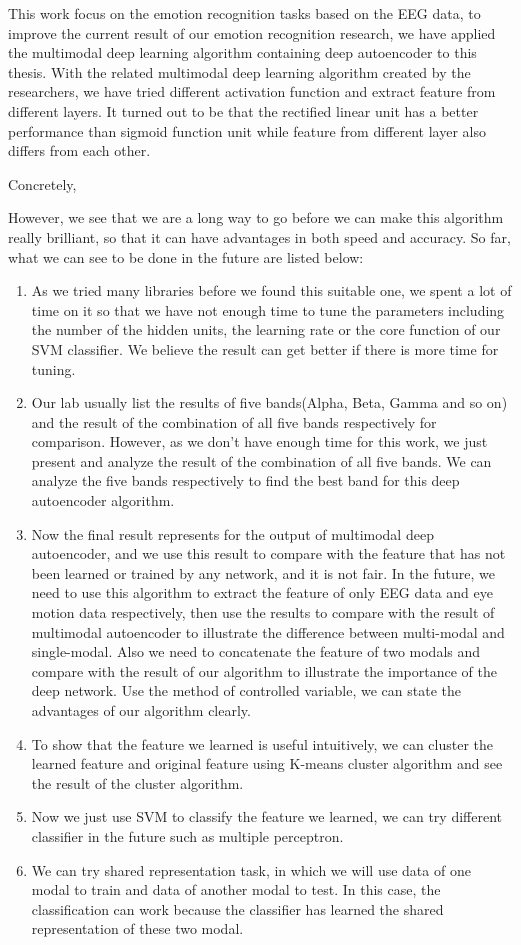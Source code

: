 	This work focus on the emotion recognition tasks based on the EEG data, to improve the current result of our emotion recognition research, we have applied the multimodal deep learning algorithm containing deep autoencoder to this thesis. With the related multimodal deep learning algorithm created by the researchers, we have tried different activation function and extract feature from different layers. It turned out to be that the rectified linear unit has a better performance than sigmoid function unit while feature from different layer also differs from each other.

	Concretely, 

	However, we see that we are a long way to go before we can make this algorithm really brilliant, so that it can have advantages in both speed and accuracy. So far, what we can see to be done in the future are listed below:
\begin{enumerate}
\item As we tried many libraries before we found this suitable one, we spent a lot of time on it so that we have not enough time to tune the parameters including the number of the hidden units, the learning rate or the core function of our SVM classifier. We believe the result can get better if there is more time for tuning.
\item Our lab usually list the results of five bands(Alpha, Beta, Gamma and so on) and the result of the combination of all five bands respectively for comparison. However, as we don’t have enough time for this work, we just present and analyze the result of the combination of all five bands. We can analyze the five bands respectively to find the best band for this deep autoencoder algorithm.
\item Now the final result represents for the output of multimodal deep autoencoder, and we use this result to compare with the feature that has not been learned or trained by any network, and it is not fair.  In the future, we need to use this algorithm to extract the feature of only EEG data and eye motion data respectively, then use the results to compare with the result of multimodal autoencoder to illustrate the difference between multi-modal and single-modal. Also we need to concatenate the feature of two modals and compare with the result of our algorithm to illustrate the importance of the deep network. Use the method of controlled variable, we can state the advantages of our algorithm clearly.
\item To show that the feature we learned is useful intuitively, we can cluster the learned feature and original feature using K-means cluster algorithm and see the result of the cluster algorithm.
\item Now we just use SVM to classify the feature we learned, we can try different classifier in the future such as multiple perceptron.
\item We can try shared representation task, in which we will use data of one modal to train and data of another modal to test. In this case, the classification can work because the classifier has learned the shared representation of these two modal.
\end{enumerate}

